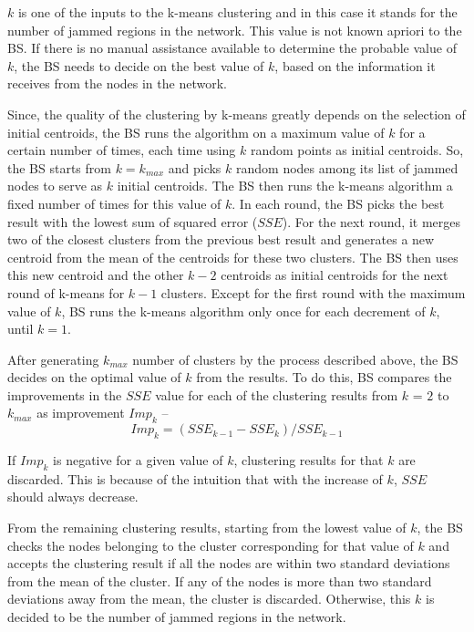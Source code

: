 \documentclass[conference]{IEEEtran}
\begin{document}
$k$ is one of the inputs to the k-means clustering and in this case it stands for the number of jammed regions in the network. This value is not known apriori to the BS. If there is no manual assistance available to determine the probable value of $k$, the BS needs to decide on the best value of $k$, based on the information it receives from the nodes in the network.

Since, the quality of the clustering by k-means greatly depends on the selection of initial centroids, the BS runs the algorithm on a maximum value of $k$ for a certain number of times, each time using $k$ random points as initial centroids. So, the BS starts from $k = k_{max}$ and picks $k$ random nodes among its list of jammed nodes to serve as $k$ initial centroids. The BS then runs the k-means algorithm a fixed number of times for this value of $k$. In each round, the BS picks the best result with the lowest sum of squared error ($SSE$). For the next round, it merges two of the closest clusters from the previous best result and generates a new centroid from the mean of the centroids for these two clusters. The BS then uses this new centroid and the other $k-2$ centroids as initial centroids for the next round of k-means for $k-1$ clusters. Except for the first round with the maximum value of $k$, BS runs the k-means algorithm only once for each decrement of $k$, until $k=1$. 


After generating $k_{max}$ number of clusters by the process described above, the BS decides on the optimal value of $k$ from the results. To do this, BS compares the improvements in the $SSE$ value for each of the clustering results from $k$ = $2$ to $k_{max}$ as improvement $Imp_{k}$ --
\begin{equation}
Imp_{k} = ({SSE_{k-1} - SSE_{k}}) / SSE_{k-1}
\end{equation}

\noindent If $Imp_{k}$ is negative for a given value of $k$, clustering results for that $k$ are discarded. This is because of the intuition that with the increase of $k$, $SSE$ should always decrease.

From the remaining clustering results, starting from the lowest value of $k$, the BS checks the nodes belonging to the cluster corresponding for that value of $k$ and accepts the clustering result if all the nodes are within two standard deviations from the mean of the cluster. If any of the nodes is more than two standard deviations away from the mean, the cluster is discarded. Otherwise, this $k$ is decided to be the number of jammed regions in the network. 
\end{document}
